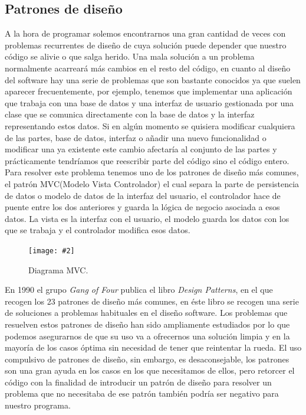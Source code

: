 \documentclass[12pt,a4paper,spanish]{book} %
\newcommand{\imgCentradaMed}[3]{
\begin{figure}[H]
\begin{center}
\texttt{[image: \#2]}
\caption{#3}
\label{#1}
\end{center}
\end{figure}
}
\begin{document}
\subsection{Patrones de diseño}

\lettrine{A}{} la hora de programar solemos encontrarnos una gran cantidad de veces con problemas recurrentes de diseño de cuya solución puede depender que nuestro código se alivie o que salga herido. Una mala solución a un problema normalmente acarreará más cambios en el resto del código, en cuanto al diseño del software hay una serie de problemas que son bastante conocidos ya que suelen aparecer frecuentemente, por ejemplo, tenemos que implementar una aplicación que trabaja con una base de datos y una interfaz de usuario gestionada por una clase que se comunica directamente con la base de datos y la interfaz representando estos datos. Si en algún momento se quisiera modificar cualquiera de las partes, base de datos, interfaz o añadir una nuevo funcionalidad o modificar una ya existente este cambio afectaría al conjunto de las partes y prácticamente tendríamos que reescribir parte del código sino el código entero. Para resolver este problema tenemos uno de los patrones de diseño más comunes, el patrón MVC(Modelo Vista Controlador) el cual separa la parte de persistencia de datos o modelo de datos de la interfaz del usuario, el controlador hace de puente entre los dos anteriores y guarda la lógica de negocio asociada a esos datos. La vista es la interfaz con el usuario, el modelo guarda los datos con los que se trabaja y el controlador modifica esos datos.

\imgCentradaMed{fig.2.8}{img/mvc.eps}{Diagrama MVC.}

\newpage
En 1990 el grupo \emph{Gang of Four} publica el libro \emph{Design Patterns}, en el que recogen los 23 patrones de diseño más comunes, en éste libro se recogen una serie de soluciones a problemas habituales en el diseño software. Los problemas que resuelven estos patrones de diseño han sido ampliamente estudiados por lo que podemos asegurarnos de que su uso va a ofrecernos una solución limpia y en la mayoría de los casos óptima sin necesidad de tener que reintentar la rueda. El uso compulsivo de patrones de diseño, sin embargo, es desaconsejable, los patrones son una gran ayuda en los casos en los que necesitamos de ellos, pero retorcer el código con la finalidad de introducir un patrón de diseño para resolver un problema que no necesitaba de ese patrón también podría ser negativo para nuestro programa.
\end{document}
